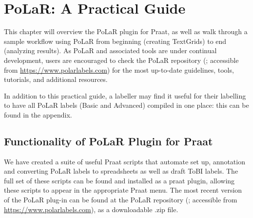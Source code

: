 \chapter{PoLaR: A Practical Guide}\label{ch:practical}

This chapter will overview the PoLaR plugin for Praat, as well as walk through a sample workflow using PoLaR from beginning (creating TextGrids) to end (analyzing results). As PoLaR and associated tools are under continual development, users are encouraged to check the PoLaR repository (\citealt{ahn-21}; accessible from \href{https://www.polarlabels.com}{https://www.polarlabels.com}) for the most up-to-date guidelines, tools, tutorials, and additional resources.

In addition to this practical guide, a labeller may find it useful for their labelling to have all PoLaR labels (Basic and Advanced) compiled in one place: this can be found in the appendix.

\section{Functionality of PoLaR Plugin for Praat}\label{sec:polar-plugin-for-praat}
We have created a suite of useful Praat scripts that automate set up, annotation and converting PoLaR labels to spreadsheets as well as draft ToBI labels. The full set of these scripts can be found and installed as a praat plugin, allowing these scripts to appear in the appropriate Praat menu. The most recent version of the PoLaR plug-in can be found at the PoLaR repository (\citealt{ahn-21}; accessible from \href{https://www.polarlabels.com}{https://www.polarlabels.com}), as a downloadable .zip file.


